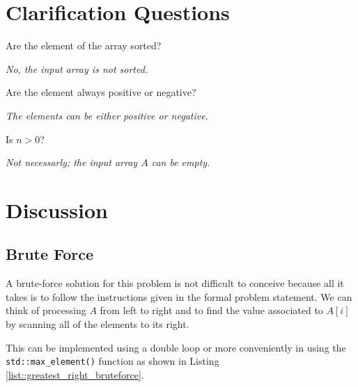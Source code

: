 \section{Clarification Questions}

\begin{QandA}
	\begin{questionitem} \begin{question} Are the element of the array sorted?  \end{question} 	 
    \begin{answered}
		\textit{No, the input array is not sorted.}
	\end{answered} \end{questionitem}
	
	\begin{questionitem} \begin{question} Are the element always positive or negative?  \end{question} 	 
    \begin{answered}
		\textit{The elements can be either positive or negative.}
	\end{answered} \end{questionitem}

	\begin{questionitem} \begin{question} Is $n>0$?  \end{question} 	 
		\begin{answered}
			\textit{Not necessarly; the input  array $A$ can be empty.}
		\end{answered} \end{questionitem}
	
\end{QandA}

\section{Discussion}

\subsection{Brute Force}
A brute-force solution for this problem is not difficult to conceive because all it takes is to follow the instructions given in the formal problem statement. 
We can think of processing $A$ from left to right and to find the value associated to $A[i]$ by scanning all of the elements to its right. 


This can be implemented using a double loop or more conveniently in \CC using the \texttt{std::max\_element()} function as shown in Listing \ref{list::greatest_right_bruteforce}. 

